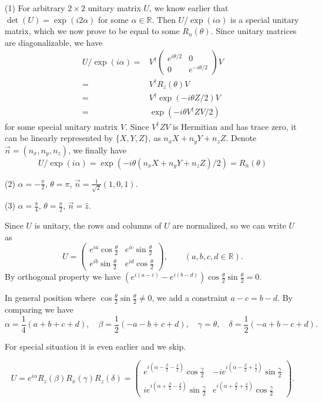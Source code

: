 \ex (1) For arbitrary $2\times 2$ unitary matrix $U$, we know earlier that $\det(U)=\exp(i2\alpha)$ for some $\alpha\in\mathbb{R}$. Then $U/\exp(i\alpha)$ is a special unitary matrix, which we now prove to be equal to some $R_n(\theta)$. Since unitary matrices are diagonalizable, we have
$$\begin{aligned}
    U/\exp(i\alpha) = & V^\dagger \begin{pmatrix}
        e^{i\theta/2} & 0 \\
        0 & e^{-i\theta/2}
    \end{pmatrix}V
    \\ = & V^\dagger R_z(\theta) V
    \\ = & V^\dagger \exp(-i\theta Z/2) V
    \\ = & \exp(-i\theta V^\dagger ZV/2)
\end{aligned}$$
for some special unitary matrix $V$.
Since $V^\dagger ZV$ is Hermitian and has trace zero, it can be linearly represented by $\{X,Y,Z\}$, as $n_xX+n_yY+n_zZ$. Denote $\vec{n}=(n_x,n_y,n_z)$, we finally have
$$
    U/\exp(i\alpha) = \exp(-i\theta (n_xX+n_yY+n_zZ)/2) = R_n(\theta)
$$

(2) $\alpha=-\frac{\pi}{2}$, $\theta=\pi$, $\vec{n}=\frac{1}{\sqrt{2}}(1,0,1)$.

(3) $\alpha=\frac{\pi}{4}$, $\theta=\frac{\pi}{2}$, $\vec{n}=\hat{z}$.

\ex Since $U$ is unitary, the rows and columns of $U$ are normalized, so we can write $U$ as
$$
    U = \begin{pmatrix}
        e^{ia}\cos\frac{\theta}{2} & e^{ic}\sin\frac{\theta}{2} \\
        e^{ib}\sin\frac{\theta}{2} & e^{id}\cos\frac{\theta}{2}
    \end{pmatrix}, \qquad(a,b,c,d\in\mathbb{R}).
$$
By orthogonal property we have $(e^{i(a-c)}-e^{i(b-d)})\cos\frac{\theta}{2}\sin\frac{\theta}{2} = 0$.

In general position where $\cos\frac{\theta}{2}\sin\frac{\theta}{2} \neq 0$, we add a constraint $a-c=b-d$. By comparing we have
$$\alpha = \frac{1}{4}(a+b+c+d),\quad
\beta = \frac{1}{2}(-a-b+c+d),\quad
\gamma = \theta,\quad
\delta = \frac{1}{2}(-a+b-c+d).$$

For special situation it is even earlier and we skip.

\ex $$U = e^{i\alpha}R_z(\beta)R_x(\gamma)R_z(\delta) = \begin{pmatrix}
    e^{i\left(\alpha-\frac{\beta}{2}-\frac{\delta}{2}\right)}\cos\frac{\gamma}{2} & -ie^{i\left(\alpha-\frac{\beta}{2}+\frac{\delta}{2}\right)}\sin\frac{\gamma}{2} \\
    ie^{i\left(\alpha+\frac{\beta}{2}-\frac{\delta}{2}\right)}\sin\frac{\gamma}{2} & e^{i\left(\alpha+\frac{\beta}{2}+\frac{\delta}{2}\right)}\cos\frac{\gamma}{2}
\end{pmatrix}.$$


